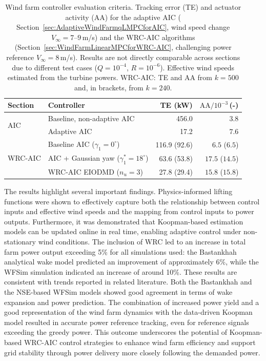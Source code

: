 \begin{table}[h]
\centering
\caption[Wind farm controller evaluation criteria: Tracking error and
actuator activity for adaptive AIC (wind speed change) and AIC vs two WRC schemes (challenging power reference).]{Wind farm controller evaluation criteria.
    Tracking error (TE) and actuator activity (AA) for the adaptive AIC
    ( Section~\ref{sec:AdaptiveWindFarmqLMPCforAIC}, wind speed change $V_\infty = 7$--$9$\,m/s)
    and the WRC-AIC algorithms
    (Section~\ref{sec:WindFarmLinearMPCforWRC-AIC}, challenging power reference $V_\infty = 8$\,m/s).
    Results are not directly comparable across sections due to different
    test cases ($Q = 10^{-4}$, $R = 10^{-6}$). Effective wind speeds estimated from the turbine powers. WRC-AIC: TE and AA from $k = 500$ and, in brackets, from $k = 240$.}
\label{tab:WindFarmSummary}
\begin{tabular}{ll rr}
    \toprule
    Section & Controller & TE (kW) & $\text{AA} / 10^{-3}$\,(-) \\
    \midrule
    \multirow{2}{*}{AIC}
    & Baseline, non-adaptive AIC  & 456.0 & $3.8$ \\
    & Adaptive AIC                &  17.2 & $7.6$ \\
    \midrule
    \multirow{3}{*}{WRC-AIC}
    & Baseline AIC ($\gamma_1 = 0^\circ$)              & 116.9 (92.6) & $6.5$ ($6.5$) \\
    & AIC + Gaussian yaw ($\gamma_1^* = 18^\circ$)     &  63.6 (53.8) & $17.5$ ($14.5$) \\
    & WRC-AIC EIODMD ($n_u = 3$)                       &  27.8 (29.4) & $15.8$ ($15.8$) \\
    \bottomrule
\end{tabular}
\end{table}

The results highlight several important findings. Physics-informed lifting functions were shown
to effectively capture both the relationship between control inputs and effective wind speeds and
the mapping from control inputs to power outputs. Furthermore, it was demonstrated that
Koopman-based estimation models can be updated online in real time, enabling adaptive control
under non-stationary wind conditions. The inclusion of WRC led to an increase in total
farm power output exceeding 5\% for all simulations used: the Bastankhah analytical wake model predicted
an improvement of approximately 6\%, while the WFSim simulation indicated an increase of
around 10\%. These results are consistent with trends reported in related literature. Both the
Bastankhah and the NSE-based WFSim models showed good agreement in
terms of wake expansion and power prediction. The combination of increased power yield and
a good representation of the wind farm dynamics with the data-driven Koopman model resulted in accurate power reference tracking, even for reference
signals exceeding the greedy power. This outcome underscores the potential of Koopman-based
WRC-AIC control strategies to enhance wind farm efficiency and support grid stability through power delivery more closely following the demanded power.